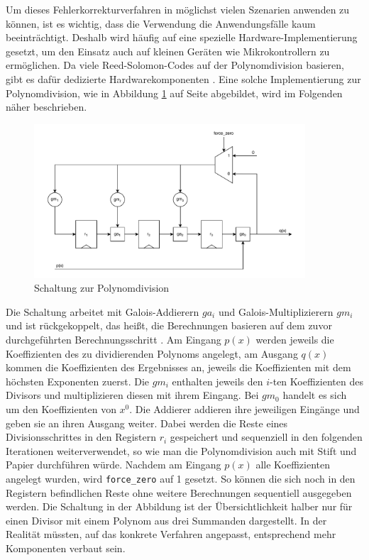 Um dieses Fehlerkorrekturverfahren in möglichst vielen Szenarien anwenden zu können, ist es wichtig, dass die Verwendung die Anwendungsfälle kaum beeinträchtigt.
Deshalb wird häufig auf eine spezielle Hardware-Implementierung gesetzt, um den Einsatz auch auf kleinen Geräten wie Mikrokontrollern zu ermöglichen.
Da viele Reed-Solomon-Codes auf der Polynomdivision basieren, gibt es dafür dedizierte Hardwarekomponenten \cite{verbeureReedSolomonErrorCorrecting2022}.
Eine solche Implementierung zur Polynomdivision, wie in Abbildung \ref{fig:polynomdivCircuit} auf Seite \pageref{fig:polynomdivCircuit} abgebildet, wird im Folgenden näher beschrieben.
\begin{figure}[ht]
	\centering
	\includegraphics[width=0.9\textwidth]{figures/Polynomdivision-Hardware.drawio.pdf}
	\caption{Schaltung zur Polynomdivision}
	\label{fig:polynomdivCircuit}
\end{figure}
Die Schaltung arbeitet mit Galois-Addierern $ga_i$ und Galois-Multiplizierern $gm_i$ und ist rückgekoppelt, das heißt, die Berechnungen basieren auf dem zuvor durchgeführten Berechnungsschritt \cite{masseyShiftregisterSynthesisBCH1969}.
Am Eingang $p(x)$ werden jeweils die Koeffizienten des zu dividierenden Polynoms angelegt, am Ausgang $q(x)$ kommen die Koeffizienten des Ergebnisses an, jeweils die Koeffizienten mit dem höchsten Exponenten zuerst.
Die $gm_i$ enthalten jeweils den $i$-ten Koeffizienten des Divisors und multiplizieren diesen mit ihrem Eingang.
Bei $gm_0$ handelt es sich um den Koeffizienten von $x^0$. 
Die Addierer addieren ihre jeweiligen Eingänge und geben sie an ihren Ausgang weiter.
Dabei werden die Reste eines Divisionsschrittes in den Registern $r_i$ gespeichert und sequenziell in den folgenden Iterationen weiterverwendet, so wie man die Polynomdivision auch mit Stift und Papier durchführen würde.
Nachdem am Eingang $p(x)$ alle Koeffizienten angelegt wurden, wird \texttt{force\_zero} auf 1 gesetzt.
So können die sich noch in den Registern befindlichen Reste ohne weitere Berechnungen sequentiell ausgegeben werden.
Die Schaltung in der Abbildung ist der Übersichtlichkeit halber nur für einen Divisor mit einem Polynom aus drei Summanden dargestellt.
In der Realität müssten, auf das konkrete Verfahren angepasst, entsprechend mehr Komponenten verbaut sein.


